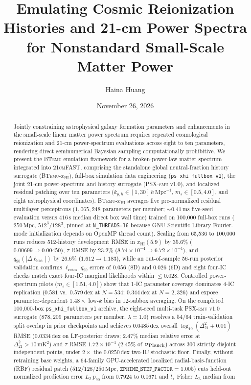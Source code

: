 \documentclass[aps,prd,reprint,superscriptaddress,nofootinbib,amsmath,amssymb,floatfix,longbibliography]{revtex4-2}
\newcommand{\manuscripttitle}{Emulating Cosmic Reionization Histories and 21-cm Power Spectra for Nonstandard Small-Scale Matter Power}
\begin{document}
\title{\manuscripttitle}
\author{Haina Huang}
\date{November 26, 2026}

\begin{abstract}
Jointly constraining astrophysical galaxy formation parameters and enhancements in the small-scale linear matter power spectrum requires repeated cosmological reionization and 21-cm power-spectrum evaluations across eight to ten parameters, rendering direct seminumerical Bayesian sampling computationally prohibitive. We present the \textsc{BTemu} emulation framework for a broken-power-law matter spectrum integrated into \textsc{21cmFAST}, comprising the standalone global neutral-fraction history surrogate (\textsc{BTemu}-$x_{\mathrm{HI}}$), full-box simulation data engineering (\texttt{ps\_xhi\_fullbox\_v1}), the joint 21-cm power-spectrum and history surrogate (\textsc{PSX-emu v1.0}), and localized residual patching over ten parameters ($k_{p,h} \in [1, 30]\,h\,\mathrm{Mpc}^{-1}$, $m_s \in [0.5, 4.0]$, and eight astrophysical coordinates). \textsc{BTemu}-$x_{\mathrm{HI}}$ averages five pre-normalized residual multilayer perceptrons ($1{,}065{,}248$ parameters per member; $\sim 0.41\,\mathrm{ms}$ five-seed evaluation versus $416\,\mathrm{s}$ median direct box wall time) trained on 100,000 full-box runs ($250\,\mathrm{Mpc}$, $512^3/128^3$, pinned at \texttt{N\_THREADS=16} because GNU Scientific Library Fourier-mode initialization depends on OpenMP thread count). Scaling from 65,536 to 100,000 runs reduces 512-history development RMSE in $x_{\mathrm{HI}}(5.9)$ by $35.6\%$ ($0.00699 \to 0.00450$), $\tau$ RMSE by $23.2\%$ ($8.74\times 10^{-4} \to 6.72\times 10^{-4}$), and $q_{90}(|\Delta\ell_{\mathrm{hist}}|)$ by $26.6\%$ ($1.612 \to 1.183$), while an out-of-sample 56-run posterior validation confirms $\ell_{\mathrm{reion}}$ $q_{90}$ errors of $0.056$ (8D) and $0.026$ (6D) and eight four-IC checks match exact four-IC marginal likelihoods within $\le 0.028$. Controlled power-spectrum pilots ($m_s \in [1.51, 4.0]$) show that 1-IC parameter coverage dominates 4-IC replication ($0.581$ vs.\ $0.579\,\mathrm{dex}$ at $N=534$; $0.344\,\mathrm{dex}$ at $N=2{,}326$) and expose parameter-dependent $1.48\times$ low-$k$ bias in 12-subbox averaging. On the completed 100,000-box \texttt{ps\_xhi\_fullbox\_v1} archive, the eight-seed multi-task \textsc{PSX-emu v1.0} surrogate ($878{,}209$ parameters per member, $\lambda=1.0$) resolves a $54/64$ train-validation split overlap in prior checkpoints and achieves $0.0485\,\mathrm{dex}$ overall $\log_{10}(\Delta^2_{21}+0.01)$ RMSE ($0.0334\,\mathrm{dex}$ on LF-posterior draws; $2.47\%$ median relative error at $\Delta^2_{21}>10\,\mathrm{mK}^2$) and $\tau$ RMSE $1.72\times 10^{-4}$ ($2.45\%$ of $\sigma_{\rm Planck}$) across 300 strictly disjoint independent points, under $2\times$ the $0.0250\,\mathrm{dex}$ two-IC stochastic floor. Finally, without retraining base weights, a 64-family GPU-accelerated localized radial-basis-function (RBF) residual patch ($512/128/250\,\mathrm{Mpc}$, $\texttt{ZPRIME\_STEP\_FACTOR}=1.005$) cuts held-out normalized prediction error $L_2\ p_{90}$ from $0.7924$ to $0.0671$ and $t_\star$ Fisher $L_3$ median from 
\end{abstract}
\end{document}
